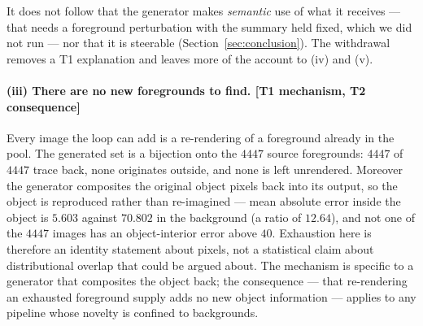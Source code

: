 \documentclass{article}
\begin{document}
It does not follow that the generator makes \emph{semantic} use of what it
receives --- that needs a foreground perturbation with the summary held fixed,
which we did not run --- nor that it is steerable
(Section~\ref{sec:conclusion}). The withdrawal removes a T1 explanation and
leaves more of the account to (iv) and (v).

\paragraph{(iii) There are no new foregrounds to find. \textnormal{[T1 mechanism, T2 consequence]}}
Every image the loop can add is a re-rendering of a foreground already in the
pool. The generated set is a bijection onto the $4447$ source foregrounds:
$4447$ of $4447$ trace back, none originates outside, and none is left
unrendered. Moreover the generator composites the original object pixels back
into its output, so the object is reproduced rather than re-imagined --- mean
absolute error inside the object is $5.603$ against $70.802$ in the background
(a ratio of $12.64$), and not one of the $4447$ images has an object-interior
error above $40$.
Exhaustion here is therefore an identity statement about pixels, not a
statistical claim about distributional overlap that could be argued about. The
mechanism is specific to a generator that composites the object back; the
consequence --- that re-rendering an exhausted foreground supply adds no new
object information --- applies to any pipeline whose novelty is confined to
backgrounds.
\end{document}
